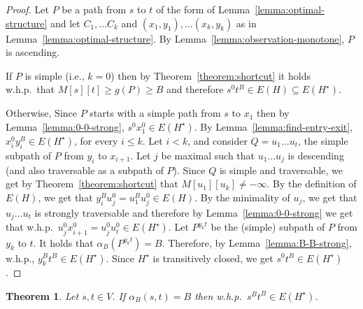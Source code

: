 \documentclass[11pt]{article}
\newtheorem{theorem}{Theorem}[section]
\begin{document}
\begin{proof}
    Let $P$ be a path from $s$ to $t$ of the form of Lemma~\ref{lemma:optimal-structure} and let $C_1, \ldots C_k$ and $(x_1,y_1),\ldots(x_k,y_k)$ as in Lemma~\ref{lemma:optimal-structure}. By Lemma~\ref{lemma:observation-monotone}, $P$ is ascending.

    If $P$ is simple (i.e., $k=0$) then by Theorem~\ref{theorem:shortcut} it holds w.h.p.\ that $M[s][t] \ge g(P) \ge B$ and therefore $s^0 t^B \in E(H) \subseteq E(H^\star)$.

    Otherwise, Since $P$ starts with a simple path from $s$ to $x_1$ then by Lemma~\ref{lemma:0-0-strong}, $s^0 x_1^0 \in E(H^\star)$.  By Lemma~\ref{lemma:find-entry-exit}, $x_i^0 y_i^B\in E(H^\star)$, for every $i\le k$. Let $i < k$, and consider $Q=u_1 \ldots u_t$, the simple subpath of $P$ from $y_i$ to $x_{i+1}$. Let $j$ be maximal such that $u_1 \ldots u_j$ is descending (and also traversable as a subpath of $P$). Since $Q$ is simple and traversable, we get by Theorem~\ref{theorem:shortcut} that $M[u_1][u_k] \neq -\infty$. By the definition of $E(H)$, we get that $y_i^B u_j^0 = u_1^B u_j^0 \in E(H)$. By the minimality of $u_j$, we get that $u_j \ldots u_t$ is strongly traversable and therefore by Lemma~\ref{lemma:0-0-strong} we get that w.h.p.\ $u_j^0 x^0_{i+1}=u^0_j u_t^0 \in E(H^\star)$. 
    Let $P^{y_k t}$ be the (simple) subpath of $P$ from $y_k$ to $t$. It holds that $\alpha_B(P^{y_k t}) = B$. Therefore, 
    by Lemma~\ref{lemma:B-B-strong}, w.h.p., $y_k^B t^B \in E(H^\star)$. Since $H^\star$ is transitively closed,  we get $s^0 t^B \in E(H^\star)$.
\end{proof}


\begin{theorem}\label{theorem:B-B-strong}
    Let $s,t\in V$. If $\alpha_B(s,t) = B$ then w.h.p.\ $s^B t^B \in E(H^\star)$.
\end{theorem}
\end{document}
